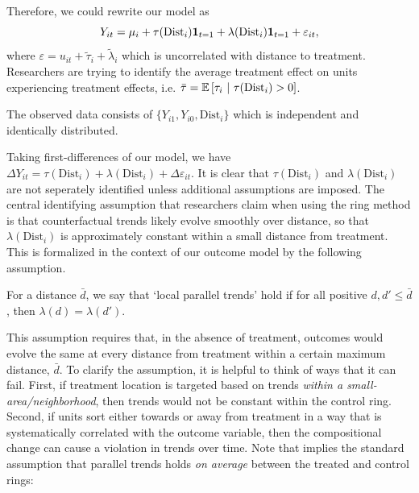 \documentclass[12pt]{article}
\newcommand{\dist}{\text{Dist}}
\begin{document}
Therefore, we could rewrite our model as 
\begin{equation}\label{eq:model}
    Y_{it} = \mu_i + \tau(\dist_i) \one_{t = 1} + \lambda(\dist_i) \one_{t=1} + \varepsilon_{it},   
\end{equation}
where $\varepsilon = u_{it} + \tilde{\tau}_i + \tilde{\lambda}_i$ which is uncorrelated with distance to treatment. Researchers are trying to identify the average treatment effect on units experiencing treatment effects, i.e. $\bar{\tau} = \condexpec{\tau_i}{\tau(\dist_i) > 0}$.

\begin{assumption}
    The observed data consists of $\{ Y_{i1}, Y_{i0}, \dist_{i}\}$ which is independent and identically distributed.
\end{assumption}

Taking first-differences of our model, we have $\Delta Y_{it} = \tau(\dist_i) + \lambda(\dist_i) + \Delta \varepsilon_{it}$. It is clear that $\tau(\dist_i)$ and $\lambda(\dist_i)$ are not seperately identified unless additional assumptions are imposed. The central identifying assumption that researchers claim when using the ring method is that counterfactual trends likely evolve smoothly over distance, so that $\lambda(\dist_i)$ is approximately constant within a small distance from treatment. This is formalized in the context of our outcome model by the following assumption. 

\begin{assumption}\label{assum:parallel}
    For a distance $\bar{d}$, we say that `local parallel trends' hold if for all positive $d, d' \leq \bar{d}$, then $\lambda(d) = \lambda(d')$.
\end{assumption}

This assumption requires that, in the absence of treatment, outcomes would evolve the same at every distance from treatment within a certain maximum distance, $\bar{d}$. To clarify the assumption, it is helpful to think of ways that it can fail. First, if treatment location is targeted based on trends \emph{within a small-area/neighborhood}, then trends would not be constant within the control ring. Second, if units sort either towards or away from treatment in a way that is systematically correlated with the outcome variable, then the compositional change can cause a violation in trends over time. Note that  implies the standard assumption that parallel trends holds \emph{on average} between the treated and control rings:
\end{document}
